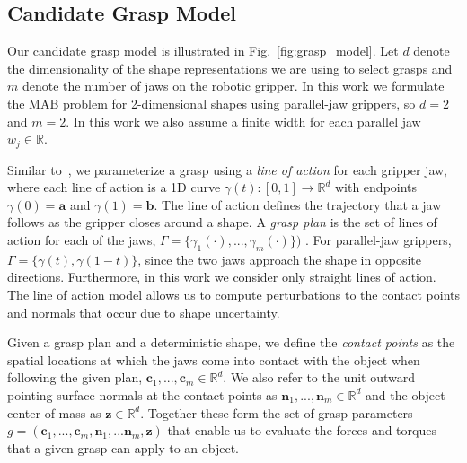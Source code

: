 \documentclass[journal,transmag]{IEEEtran}%
\newcommand{\ba}{\mathbf{a}}
\newcommand{\bb}{\mathbf{b}}
\newcommand{\bc}{\mathbf{c}}
\newcommand{\bn}{\mathbf{n}}
\newcommand{\bz}{\mathbf{z}}
\begin{document}


\subsection{Candidate Grasp Model}
Our candidate grasp model is illustrated in Fig.~\ref{fig:grasp_model}.
Let $d$ denote the dimensionality of the shape representations we are using to select grasps and $m$ denote the number of jaws on the robotic gripper.
In this work we formulate the MAB problem for 2-dimensional shapes using parallel-jaw grippers, so $d=2$ and $m=2$.
In this work we also assume a finite width for each parallel jaw $w_j \in \mathbb{R}$.

Similar to~\cite{christopoulos2007handling}, we parameterize a grasp using a {\it line of action} for each gripper jaw, where each line of action is a 1D curve $\gamma(t): [0,1] \rightarrow \mathbb{R}^d$ with endpoints $\gamma(0) = \ba$ and $\gamma(1) = \bb$.
The line of action defines the trajectory that a jaw follows as the gripper closes around a shape.
A {\it grasp plan} is the set of lines of action for each of the jaws, $\Gamma = \{\gamma_1(\cdot),...,\gamma_m(\cdot)\})$ \cite{}.
For parallel-jaw grippers, $\Gamma = \{\gamma(t), \gamma(1 - t)\}$, since the two jaws approach the shape in opposite directions.
Furthermore, in this work we consider only straight lines of action.
The line of action model allows us to compute perturbations to the contact points and normals that occur due to shape uncertainty.

Given a grasp plan and a deterministic shape, we define the {\it contact points} as the spatial locations at which the jaws come into contact with the object when following the given plan, $\bc_1, ..., \bc_m \in \mathbb{R}^d$.
We also refer to the unit outward pointing surface normals at the contact points as $\bn_1, ..., \bn_m \in \mathbb{R}^d$ and the object center of mass as $\bz \in \mathbb{R}^d$.
Together these form the set of grasp parameters $g = (\bc_1, ..., \bc_m, \bn_1, ... \bn_m, \bz)$ that enable us to evaluate the forces and torques that a given grasp can apply to an object.
\end{document}
